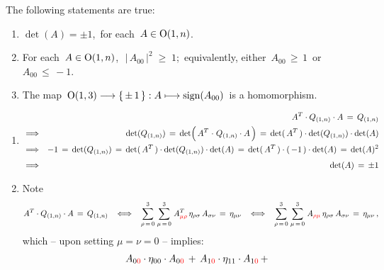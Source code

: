 \vskip 0.5cm
\begin{proposition}
\label{WellDefnSOSOup}
\mbox{}
\vskip 0.1cm
\noindent
The following statements are true:
\begin{enumerate}
\item
	$\det(A) = \pm 1$,\, for each \,$A \in \textnormal{O}(1,n)$.
\item
	For each \,$A \in \textnormal{O}(1,n)$,\,
	\,$\vert\,A_{00}\,\vert^{2} \;\geq\; 1$;\,
	equivalently, either
	\,$A_{00} \,\geq\, 1$\, or \,$A_{00} \,\leq\, -1$.\,
\item
	The map
	\,$\textnormal{O}(1,3) \longrightarrow \{\,\pm\,1\,\} : A \longmapsto \textnormal{sign}(A_{00})$\,
	is a homomorphism.
\end{enumerate}
\end{proposition}
\proof
\begin{enumerate}
\item
	\begin{eqnarray*}
	&&
		A^{T} \cdot Q_{(1,n)} \cdot A \,=\, Q_{(1,n)}
	\\
	& \Longrightarrow &
		\det(Q_{(1,n)})
		\, = \,
		\det\!\left(\,A^{T} \overset{{\color{white}1}}{\cdot} Q_{(1,n)} \cdot A\,\right)
		\,=\,
		\det(\,A^{T}\,) \cdot \det(Q_{(1,n)}) \cdot \det(A)
	\\
	& \Longrightarrow &
		-1
		\, = \,
		\det(Q_{(1,n)})
		\, = \,
		\det(\,A^{T}\,) \cdot \det(Q_{(1,n)}) \cdot \det(A)
		\, = \,
		\det(\,A^{T}\,) \cdot (\,-1\,)\cdot \det(A)
		\, = \,
		\det(A)^{2}
	\\
	& \Longrightarrow &
		\det(A)
		\, \overset{{\color{white}1}}{=} \,
		\pm 1
	\end{eqnarray*}
\item
	Note
	\begin{equation*}
	A^{T} \cdot Q_{(1,n)} \cdot A \,=\, Q_{(1,n)}
	\;\;\;\Longleftrightarrow\;\;\;
	\overset{3}{\underset{\rho\,=\,0}{\sum}}\;
		\overset{3}{\underset{\mu\,=\,0}{\sum}}\;
		A^{T}_{{\color{red}\mu\rho}}\,\eta_{\rho\sigma}\,A_{\sigma\nu}
		\, = \,
		\eta_{\mu\nu}
	\;\;\;\Longleftrightarrow\;\;\;
	\overset{3}{\underset{\rho\,=\,0}{\sum}}\;
		\overset{3}{\underset{\mu\,=\,0}{\sum}}\;
		A_{{\color{red}\rho\mu}}\,\eta_{\rho\sigma}\,A_{\sigma\nu}
		\, = \,
		\eta_{\mu\nu}\,,
	\end{equation*}
	which -- upon setting $\mu = \nu = 0$ -- implies:
	\begin{eqnarray*}
	&&
		A_{0{\color{red}0}} \cdot \eta_{00} \cdot A_{0{\color{red}0}}
		\,+\,
		A_{1{\color{red}0}} \cdot \eta_{11} \cdot A_{1{\color{red}0}}
		\,+\,

\end{eqnarray*}
\end{enumerate}
